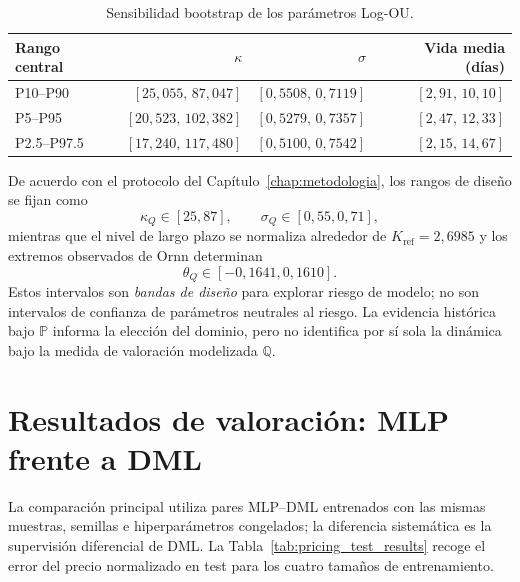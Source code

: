 \begin{table}[htbp]
    \centering
    \caption{Sensibilidad bootstrap de los parámetros Log-OU.}
    \label{tab:bootstrap_logou_results}
    \begin{tabular}{lrrr}
        \toprule
        Rango central & $\kappa$ & $\sigma$ & Vida media (días) \\
        \midrule
        P10--P90
        & $[25{,}055,\,87{,}047]$
        & $[0{,}5508,\,0{,}7119]$
        & $[2{,}91,\,10{,}10]$ \\
        P5--P95
        & $[20{,}523,\,102{,}382]$
        & $[0{,}5279,\,0{,}7357]$
        & $[2{,}47,\,12{,}33]$ \\
        P2.5--P97.5
        & $[17{,}240,\,117{,}480]$
        & $[0{,}5100,\,0{,}7542]$
        & $[2{,}15,\,14{,}67]$ \\
        \bottomrule
    \end{tabular}
\end{table}

De acuerdo con el protocolo del Capítulo~\ref{chap:metodologia}, los rangos de diseño
se fijan como
\begin{equation}
    \kappa_Q\in[25,87],
    \qquad
    \sigma_Q\in[0{,}55,0{,}71],
    \label{eq:result_frozen_dynamic_domain}
\end{equation}
mientras que el nivel de largo plazo se normaliza alrededor de
$K_{\mathrm{ref}}=2{,}6985$ y los extremos observados de Ornn determinan
\begin{equation}
    \theta_Q\in[-0{,}1641,0{,}1610].
    \label{eq:result_theta_domain}
\end{equation}
Estos intervalos son \emph{bandas de diseño} para explorar riesgo de modelo; no son
intervalos de confianza de parámetros neutrales al riesgo. La evidencia histórica bajo
$\mathbb P$ informa la elección del dominio, pero no identifica por sí sola la dinámica
bajo la medida de valoración modelizada $\mathbb Q$.

\section{Resultados de valoración: MLP frente a DML}
\label{sec:resultados_pricing}

La comparación principal utiliza pares MLP--DML entrenados con las mismas muestras,
semillas e hiperparámetros congelados; la diferencia sistemática es la supervisión
diferencial de DML. La Tabla~\ref{tab:pricing_test_results} recoge el error del precio
normalizado en test para los cuatro tamaños de entrenamiento.

